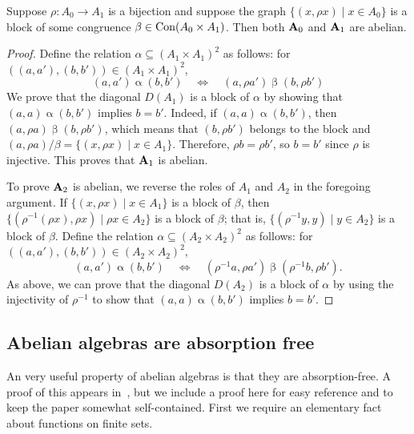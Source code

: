 \begin{lemma}
  \label{lem:bijection_abelian}
  Suppose $\rho \colon A_0 \to A_1$ is a bijection and suppose the graph
  $\{(x, \rho x) \mid x \in A_0\}$ is a block of some congruence
  $\beta \in \operatorname{Con} (A_0 \times A_1)$.  Then both $\mathbf{A}_0$ and $\mathbf{A}_1$ are abelian.
\end{lemma}
\begin{proof}
  Define the relation $\alpha\subseteq (A_1\times A_1)^2$ as follows: for
  $((a,a'), (b,b')) \in (A_1\times A_1)^2$,
  \[
  (a,a')\mathrel{\alpha} (b,b')
  \quad \iff \quad
  (a, \rho a') \mathrel{\beta} (b, \rho b')
  \]
  We prove that the diagonal $D(A_1)$ is a block of $\alpha$ by showing that
  $(a, a) \mathrel{\alpha} (b,b')$ implies $b = b'$.
  Indeed, if $(a, a) \mathrel{\alpha} (b,b')$, then
  $(a, \rho a) \mathrel{\beta} (b, \rho b')$, which means that
  $(b, \rho b')$ belongs to the block and
  $(a, \rho a)/\beta = \{(x, \rho x)\mid x\in A_1\}$.  Therefore,
  $\rho b  = \rho b'$, so $b = b'$ since $\rho$ is injective.
  This proves that $\mathbf{A}_1$ is abelian.

  To prove $\mathbf{A}_2$ is abelian, we reverse the roles of $A_1$ and $A_2$ in the
  foregoing argument.  
  If $\{(x, \rho x) \mid x \in A_1\}$ is a block of $\beta$,
  then 
  $\{(\rho^{-1}(\rho x), \rho x) \mid \rho x \in A_2\}$ is a block of $\beta$; that
  is, $\{(\rho^{-1} y, y) \mid y \in A_2\}$ is a block of $\beta$.  Define 
  the relation $\alpha\subseteq (A_2\times A_2)^2$ as follows: for
  $((a,a'), (b,b')) \in (A_2\times A_2)^2$,
  \[
  (a,a')\mathrel{\alpha} (b,b')
  \quad \iff \quad
  (\rho^{-1}a, \rho a') \mathrel{\beta} (\rho^{-1}b, \rho b').
  \]
  As above, we can prove that the diagonal $D(A_2)$ is a block of $\alpha$
  by using the injectivity of $\rho^{-1}$ to show that $(a, a) \mathrel{\alpha}
  (b,b')$
  implies $b = b'$.
\end{proof}

\bigskip

\subsection{Abelian algebras are absorption free}
\label{sec:proof-that-abelian}
An very useful property of abelian algebras is that they are absorption-free.
A proof of this appears in~\cite[Lem~4.1]{MR3374664}, but we include 
a proof here for easy reference and to keep the paper somewhat self-contained.
First we require an elementary fact about functions on finite sets.

